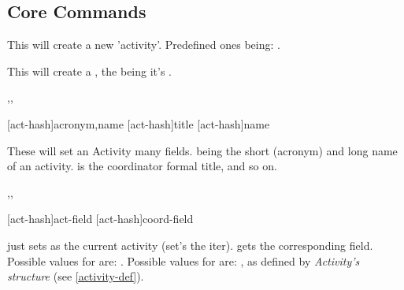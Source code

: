 \documentclass[article,nogeometry,english,tocdepth=3,secdepth=3]{ufrgscca} %
\begin{document}
\label{student-def}



\subsection{Core Commands}\label{core-commands}



\begin{codedescribe}[code,new=2023/11/18]{\NewActivity}
	\begin{codesyntax}%
	\end{codesyntax}
This will create a new 'activity'. Predefined ones being: .
\end{codedescribe}
\begin{tsremark}
This will create a , the  being it's .
\end{tsremark}



\begin{codedescribe}[code,new=2023/11/18]{\ActivitySet,\ActivitySetCoordTitle,\ActivitySetCoord}
	\begin{codesyntax}%
    \tsmacro{\ActivitySet}[act-hash]{acronym,name}
    \tsmacro{\ActivitySetCoordTitle}[act-hash]{title}
    \tsmacro{\ActivitySetCoord}[act-hash]{name}
	\end{codesyntax}
These will set an Activity many fields.  being the short (acronym) and long name of an activity.  is the coordinator formal title, and so on.
\end{codedescribe}



\begin{codedescribe}[code,new=2023/11/18]{\ActivitySelect,\Activity,\ActivityCoord}
	\begin{codesyntax}%
    \tsmacro{\Activity}[act-hash]{act-field}
    \tsmacro{\ActivityCoord}[act-hash]{coord-field}
	\end{codesyntax}
\tsobj{\ActivitySelect} just sets  as the current activity (set's the  iter). \tsobj{\Activity,\ActivityCoord} gets the corresponding field.
Possible values for  are: .
Possible values for  are: , as defined by \emph{Activity's structure} (see \ref{activity-def}).

\end{codedescribe}
\end{document}
